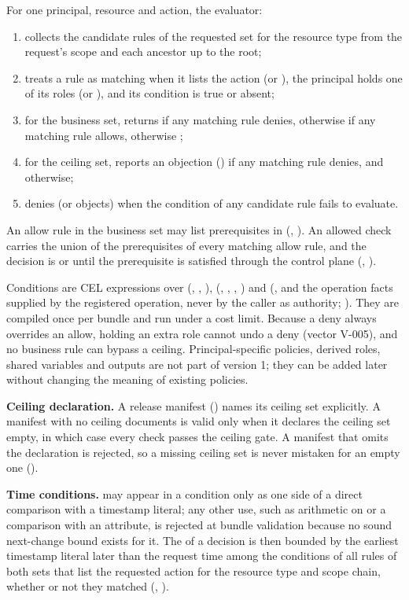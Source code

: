 For one principal, resource and action, the evaluator:
\begin{enumerate}
\item collects the candidate rules of the requested set for the resource type from the request's scope and each ancestor up to the root;
\item treats a rule as matching when it lists the action (or \code{*}), the principal holds one of its roles (or \code{*}), and its condition is true or absent;
\item for the business set, returns  if any matching rule denies, otherwise  if any matching rule allows, otherwise ;
\item for the ceiling set, reports an objection () if any matching rule denies, and  otherwise;
\item denies (or objects) when the condition of any candidate rule fails to evaluate.
\end{enumerate}
An allow rule in the business set may list prerequisites in  (, ). An allowed check carries the union of the prerequisites of every matching allow rule, and the decision is  or  until the prerequisite is satisfied through the control plane (, ).

Conditions are CEL expressions over  (, , ),  (, , , ) and  (, and the operation facts supplied by the registered operation, never by the caller as authority; ). They are compiled once per bundle and run under a cost limit. Because a deny always overrides an allow, holding an extra role cannot undo a deny (vector V-005), and no business rule can bypass a ceiling. Principal-specific policies, derived roles, shared variables and outputs are not part of version 1; they can be added later without changing the meaning of existing policies.

\textbf{Ceiling declaration.} A release manifest () names its ceiling set explicitly. A manifest with no ceiling documents is valid only when it declares the ceiling set empty, in which case every check passes the ceiling gate. A manifest that omits the declaration is rejected, so a missing ceiling set is never mistaken for an empty one ().

\textbf{Time conditions.}  may appear in a condition only as one side of a direct comparison with a timestamp literal; any other use, such as arithmetic on  or a comparison with an attribute, is rejected at bundle validation because no sound next-change bound exists for it. The  of a decision is then bounded by the earliest timestamp literal later than the request time among the conditions of all rules of both sets that list the requested action for the resource type and scope chain, whether or not they matched (, ).

